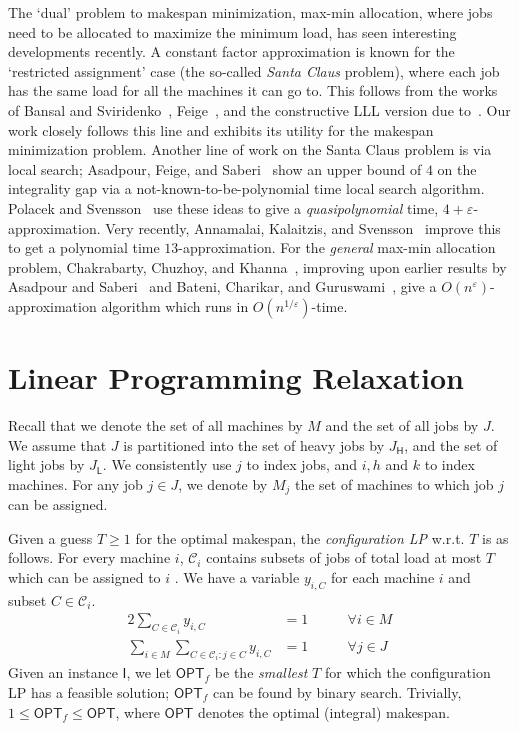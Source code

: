 \documentclass[11pt]{article}
\newcommand{\cC}{{\mathscr C}}
\newcommand{\cI}{{\mathsf I}}
\newcommand{\sfH}{{\mathsf H}}
\newcommand{\sfL}{{\mathsf L}}
\renewcommand{\epsilon}{\varepsilon}
\newcommand{\OPT}{{\mathsf{OPT}}}
\renewcommand{\epsilon}{\varepsilon}
\begin{document}
The `dual' problem to makespan minimization, max-min allocation, where jobs need to be allocated to maximize the minimum load, has seen interesting developments recently. A constant factor approximation is known for the `restricted assignment' case (the so-called {\em Santa Claus} problem), where each job has the same load for all the machines it can go to. This follows from the works of Bansal and Sviridenko~\cite{BS06}, Feige~\cite{Fei08}, and the constructive LLL version due to~\cite{MT10,HSS11}. Our work closely follows this line and exhibits its utility for the makespan minimization problem. Another line of work on the Santa Claus problem is via local search; Asadpour, Feige, and Saberi~\cite{AFS08} show an upper bound of $4$ on the integrality gap via a not-known-to-be-polynomial time local search algorithm. Polacek and Svensson~\cite{PS12} use these ideas to give a {\em quasipolynomial} time, $4+\epsilon$-approximation. Very recently, Annamalai, Kalaitzis, and Svensson~\cite{AKS15} improve this to get a polynomial time $13$-approximation.
For the {\em general} max-min allocation problem, Chakrabarty, Chuzhoy, and Khanna~\cite{CCK09}, improving upon earlier results by Asadpour and Saberi~\cite{AS07} and Bateni, Charikar, and Guruswami~\cite{BCG09}, give a $O(n^\epsilon)$-approximation algorithm which runs in $O(n^{1/\epsilon})$-time.




\section{Linear Programming Relaxation}
\label{sec:LP}

Recall that we denote the set of all machines by $M$ and the set of all jobs by $J$. We assume that $J$ is partitioned into the set of heavy jobs by $J_\sfH$, and the set of light jobs by $J_\sfL$.  We consistently use $j$ to index jobs, and $i,h$ and $k$ to index machines. For any job $j \in J$, we denote by $M_j$ the set of machines to which job $j$ can be assigned.

Given a guess $T\geq 1$ for the optimal makespan, the {\em configuration LP} w.r.t. $T$ is as follows. For every machine $i$, $\cC_i$ contains subsets of jobs of total load at most $T$ which can be assigned to $i$ . We have a variable $y_{i,C}$ for each machine $i$ and subset $C\in \cC_i$. \begin{alignat}{2}
\textstyle \sum_{C\in \cC_i} y_{i,C} & = 1& \qquad \forall i\in M \label{eq:ConfLP1}\tag{Conf LP 1}\\
\textstyle \sum_{i\in M}\sum_{C\in \cC_i:j\in C} y_{i,C} & = 1& \qquad \forall j\in J \label{eq:ConfLP2} \tag{Conf LP 2}
\end{alignat}
\noindent
Given an instance $\cI$, we let $\OPT_f$ be the {\em smallest} $T$ for which the configuration LP has a feasible solution; $\OPT_f$ can be found by binary search.
Trivially, $1\leq \OPT_f \leq \OPT$, where $\OPT$ denotes the optimal (integral) makespan. 
\end{document}
